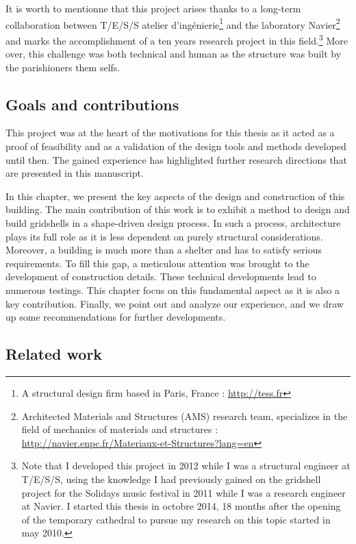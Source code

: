 It is worth to mentionne that this project arises thanks to a long-term collaboration between {T/E/S/S atelier d'ingénierie}\footnote{A structural design firm based in Paris, France : \url{http://tess.fr}} and the laboratory Navier\footnote{Architected Materials and Structures (AMS) research team, specializes in the field of mechanics of materials and structures : \url{http://navier.enpc.fr/Materiaux-et-Structures?lang=en}} and marks the accomplishment of a ten years research project in this field.\footnote{Note that I developed this project in 2012 while I was a structural engineer at T/E/S/S, using the knowledge I had previously gained on the gridshell project for the Solidays music festival in 2011 while I was a research engineer at Navier. I started this thesis in octobre 2014, 18 months after the opening of the temporary cathedral to pursue my research on this topic started in may 2010.} More over, this challenge was both technical and human as the structure was built by the parishioners them selfs.

\subsection{Goals and contributions}

This project was at the heart of the motivations for this thesis as it acted as a proof of feasibility and as a validation of the design tools and methods developed until then. The gained experience has highlighted further research directions that are presented in this manuscript.

In this chapter, we present the key aspects of the design and construction of this building. The main contribution of this work is to exhibit a method to design and build gridshells in a shape-driven design process. In such a process, architecture plays its full role as it is less dependent on purely structural considerations. Moreover, a building is much more than a shelter and has to satisfy serious requirements. To fill this gap, a meticulous attention was brought to the development of construction details. These technical developments lead to numerous testings. This chapter focus on this fundamental aspect as it is also a key contribution. Finally, we point out and analyze our experience, and we draw up some recommendations for further developments.

\subsection{Related work}


